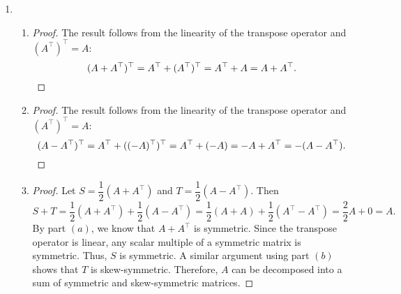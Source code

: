 \begin{enumerate}[!HW!, start=1]
\itemspade \begin{multicols}{2} The projection of the unit square is the line segment between the points $(0,0)$ and $(1,1)$. As such, it has no area because it is only a line segment. The notion of area is lost by projections.
\begin{center}
\end{center}
\end{multicols}

\item \begin{enumerate}
    \item \begin{proof}
The result follows from the linearity of the transpose operator and $(A^\top )^\top  = A$:
\[(A+A^\top )^\top  = A^\top +(A^\top )^\top  =  A^\top  + A = A+A^\top . \qedhere\]
\end{proof}\vs 
    \item \begin{proof}
The result follows from the linearity of the transpose operator and $(A^\top )^\top  = A$:
\[(A-A^\top )^\top  = A^\top +((-A)^\top )^\top  =  A^\top  + (-A) = -A+A^\top  = -(A-A^\top ). \qedhere\]
\end{proof}

    \item \begin{proof}
Let $S = \dfrac{1}{2}(A+A^\top )$ and $T = \dfrac{1}{2}(A-A^\top )$. Then 
\[S+T = \dfrac{1}{2}(A+A^\top ) + \dfrac{1}{2}(A-A^\top ) = \dfrac{1}{2}(A+A) + \dfrac{1}{2}(A^\top -A^\top ) = \dfrac{2}{2}A + 0 = A.\] By part $(a)$, we know that $A+A^\top $ is symmetric. Since the transpose operator is linear, any scalar multiple of a symmetric matrix is symmetric. Thus, $S$ is symmetric. A similar argument using part $(b)$ shows that $T$ is skew-symmetric. Therefore, $A$ can be decomposed into a sum of symmetric and skew-symmetric matrices.
\end{proof}
\end{enumerate}


\end{enumerate}
